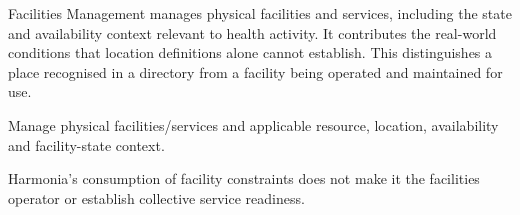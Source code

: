 Facilities Management manages physical facilities and services, including the state and availability context relevant to health activity. It contributes the real-world conditions that location definitions alone cannot establish. This distinguishes a place recognised in a directory from a facility being operated and maintained for use.



Manage physical facilities/\allowbreak{}services and applicable resource, location, availability and facility-state context.



Harmonia's consumption of facility constraints does not make it the facilities operator or establish collective service readiness.


